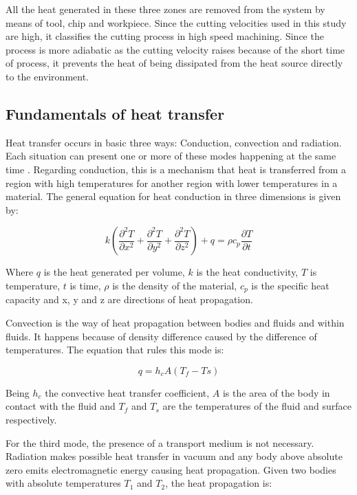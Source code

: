 	All the heat generated in these three zones are removed from the system by means of tool, chip and workpiece. Since the cutting velocities used in this study are high, it classifies the cutting process in high speed machining. Since the process is more adiabatic as the cutting velocity raises because of the short time of process, it prevents the heat of being dissipated from the heat source directly to the environment. 

	\subsection{Fundamentals of heat transfer}

	Heat transfer occurs in basic three ways: Conduction, convection and radiation. Each situation can present one or more of these modes happening at the same time \cite{poole1989fundamentals}. Regarding conduction, this is a mechanism that heat is transferred from a region with high temperatures for another region with lower temperatures in a material. The general equation for heat conduction in three dimensions is given by:

	\begin{equation} 
	\label{}
	k(\frac{\partial ^{2}T}{\partial x^{2}} + \frac{\partial ^{2}T}{\partial y^{2}} + \frac{\partial ^{2}T}{\partial z^{2}}) + q = \rho c_{p}\frac{\partial T}{\partial t}
	\end{equation}

	Where $q$ is the heat generated per volume, $k$ is the heat conductivity, $T$ is temperature, $t$ is time, $\rho$ is the density of the material, $c_{p}$ is the specific heat capacity and x, y and z are directions of heat propagation.

	Convection is the way of heat propagation between bodies and fluids and within fluids. It happens because of density difference caused by the difference of temperatures. The equation that rules this mode is:

	\begin{equation} 
	\label{}
	q = h_{c}A(T_{f} - T{s})
	\end{equation}

	Being $h_{c}$ the convective heat transfer coefficient, $A$ is the area of the body in contact with the fluid and $T_{f}$ and $T_{s}$ are the temperatures of the fluid and surface respectively.

	For the third mode, the presence of a transport medium is not necessary. Radiation makes possible heat transfer in vacuum and any body above absolute zero emits electromagnetic energy causing heat propagation. Given two bodies with absolute temperatures $T_{1}$ and $T_{2}$, the heat propagation is:

